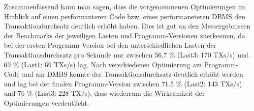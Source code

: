 Zusammenfassend kann man sagen, dass die vorgenommenen Optimierungen im Hinblick auf einen performanteren Code bzw. eines performaneteren DBMS den Transaktiondurchsatz deutlich erhöht haben.
Dies ist gut an den Messergebnissen der Benchmarks der jeweiligen Lasten und Programm-Versionen zuerkennen, da bei der ersten Programm-Version bei den unterschiedlichen Lasten der Transaktionsdurchsatz pro Sekunde nur zwischen 56,7 \% (Last3: 170 TXs/s) und 69 \% (Last1: 69 TXs/s) lag.
Nach verschiedenen Optimierung am Programm-Code und am DMBS konnte der Transaktionsdurchsatz deutlich erhöht werden und lag bei der finalen Programm-Version zwischen 71.5 \% (Last2: 143 TXs/s) und 76 \% (Last3: 228 TX/s), dass wiederrum die Wirksamkeit der Optimierungen verdeutlicht.

